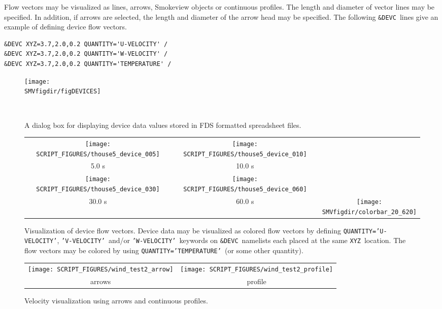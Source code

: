 \documentclass[11pt,twoside]{book}
\newcommand{\figheightAbar}{2.2in}
\begin{document}
Flow vectors may be visualized as lines, arrows, Smokeview objects or continuous profiles.  The length
and diameter of vector lines may be specified.  In addition, if arrows are selected, the length and diameter of the arrow head may be specified.
The following {\tt \&DEVC}\ lines give an example of defining device flow vectors.

\begin{verbatim}
&DEVC XYZ=3.7,2.0,0.2 QUANTITY='U-VELOCITY' /
&DEVC XYZ=3.7,2.0,0.2 QUANTITY='W-VELOCITY' /
&DEVC XYZ=3.7,2.0,0.2 QUANTITY='TEMPERATURE' /
\end{verbatim}


\begin{figure}[bph]
\begin{center}
\texttt{[image: \\SMVfigdir/figDEVICES]}
\end{center}
\caption{A dialog box for displaying device data values stored in
FDS formatted spreadsheet files.}\ \label{figDEVICES}
\end{figure}


\begin{figure}[bph]
\begin{center}
\begin{tabular}{ccc}
\texttt{[image: SCRIPT\_FIGURES/thouse5\_device\_005]}&
\texttt{[image: SCRIPT\_FIGURES/thouse5\_device\_010]}\\
5.0 s&10.0 s\\
\texttt{[image: SCRIPT\_FIGURES/thouse5\_device\_030]}&
\texttt{[image: SCRIPT\_FIGURES/thouse5\_device\_060]}&\\
30.0 s&60.0 s
&\raisebox{0.0ex}[0pt]{\texttt{[image: \\SMVfigdir/colorbar\_20\_620]}}\\
\end{tabular}
\caption [Visualization of device flow vectors.]
{Visualization of device flow vectors.
Device data may be visualized as colored flow vectors by defining {\tt QUANTITY='U-VELOCITY'},
{\tt 'V-VELOCITY'}\ and/or
{\tt 'W-VELOCITY'}\ keywords
on {\tt \&DEVC}\ namelists each placed at the same {\tt XYZ}\ location.
The flow vectors may be colored by
using {\tt QUANTITY='TEMPERATURE'}\ (or some other quantity).
}
\label{figdevicevectors}%
\end{center}
\end{figure}

\begin{figure}[bph]
\begin{center}
\begin{tabular}{cc}
\texttt{[image: SCRIPT\_FIGURES/wind\_test2\_arrow]}&
\texttt{[image: SCRIPT\_FIGURES/wind\_test2\_profile]}\\
arrows&profile\\

\end{tabular}
\caption [Velocity visualization using arrows and continuous profiles.]
{Velocity visualization using arrows and continuous profiles.}
\label{figwindprofile}%
\end{center}
\end{figure}
\end{document}
